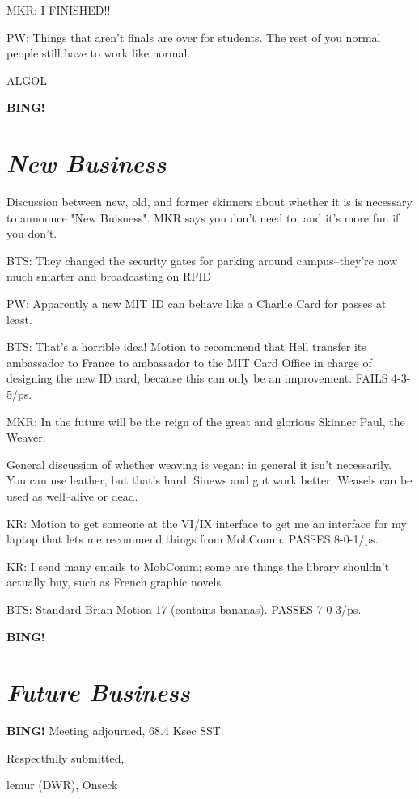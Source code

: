 \documentclass[10pt]{article}
\newcommand{\bing}{{\bf BING!} }
\newcommand{\goto}[1]{\bing \vskip 12pt \section*{{\em{#1}}}}
\newcommand{\onseck}{lemur (DWR), Onseck}
\begin{document}
MKR: I FINISHED!!

PW: Things that aren't finals are over for students.  The rest of you normal
people still have to work like normal.

ALGOL


\goto{New Business}

Discussion between new, old, and former skinners about whether it is
is necessary to announce "New Buisness".  MKR says you don't need to,
and it's more fun if you don't.

BTS: They changed the security gates for parking around campus--they're
now much smarter and broadcasting on RFID

PW: Apparently a new MIT ID can behave like a Charlie Card for passes at
least. 

BTS: That's a horrible idea!  Motion to recommend that Hell transfer its
ambassador to France to ambassador to the MIT Card Office in charge of
designing the new ID card, because this can only be an improvement. 
FAILS 4-3-5/ps.

MKR: In the future will be the reign of the great and glorious Skinner 
Paul, the Weaver.

General discussion of whether weaving is vegan; in general it isn't
necessarily.  You can use leather, but that's hard.  Sinews and gut
work better.  Weasels can be used as well--alive or dead.

KR: Motion to get someone at the VI/IX interface to get me an interface
for my laptop that lets me recommend things from MobComm. PASSES 8-0-1/ps.

KR: I send many emails to MobComm; some are things the library shouldn't
actually buy, such as French graphic novels.

BTS: Standard Brian Motion 17 (contains bananas).  PASSES 7-0-3/ps.

\goto{Future Business}

\bing
\noindent
Meeting adjourned, 68.4 Ksec SST.

\vspace{18pt}

\centerline{Respectfully submitted,}
\centerline{\onseck}
\end{document}
